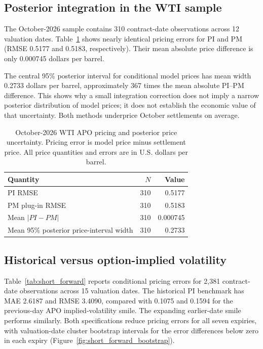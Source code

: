\subsection{Posterior integration in the WTI sample}

The October-2026 sample contains 310 contract-date observations across 12 valuation dates. Table~\ref{tab:short_october} shows nearly identical pricing errors for PI and PM (RMSE 0.5177 and 0.5183, respectively). Their mean absolute price difference is only 0.000745 dollars per barrel.

The central 95\% posterior interval for conditional model prices has mean width 0.2733 dollars per barrel, approximately 367 times the mean absolute PI--PM difference. This shows why a small integration correction does not imply a narrow posterior distribution of model prices; it does not establish the economic value of that uncertainty. Both methods underprice October settlements on average.

\begin{table}[t]
\centering
\caption{October-2026 WTI APO pricing and posterior price uncertainty. Pricing error is model price minus settlement price. All price quantities and errors are in U.S. dollars per barrel.}\label{tab:short_october}
\begin{tabular}{lrr}
\toprule
Quantity & $N$ & Value \\
\midrule
PI RMSE & 310 & 0.5177 \\
PM plug-in RMSE & 310 & 0.5183 \\
Mean $|PI-PM|$ & 310 & 0.000745 \\
Mean 95\% posterior price-interval width & 310 & 0.2733 \\
\bottomrule
\end{tabular}
\end{table}

\subsection{Historical versus option-implied volatility}

Table~\ref{tab:short_forward} reports conditional pricing errors for 2,381 contract-date observations across 15 valuation dates. The historical PI benchmark has MAE 2.6187 and RMSE 3.4090, compared with 0.1075 and 0.1594 for the previous-day APO implied-volatility smile. The expanding earlier-date smile performs similarly. Both specifications reduce pricing errors for all seven expiries, with valuation-date cluster bootstrap intervals for the error differences below zero in each expiry (Figure~\ref{fig:short_forward_bootstrap}).

